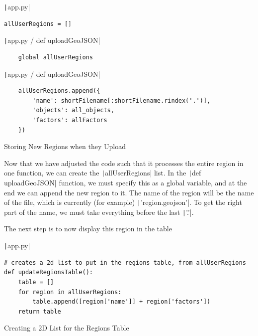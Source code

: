 \documentclass[12pt]{report}
\newcommand{\pil}[1]{\protect\texttt|#1|}
\begin{document}
\begin{center}
\end{center}

\begin{listing}[H]
\pil{app.py}
\begin{verbatim}
allUserRegions = []
\end{verbatim}
\pil{app.py / def uploadGeoJSON}
\begin{verbatim}
    global allUserRegions
\end{verbatim}
\pil{app.py / def uploadGeoJSON}
\begin{verbatim}
    allUserRegions.append({
        'name': shortFilename[:shortFilename.rindex('.')],
        'objects': all_objects,
        'factors': allFactors
    })
\end{verbatim}
\caption{Storing New Regions when they Upload}\label{cs:storeNewRegions}
\end{listing}

Now that we have adjusted the code such that it processes the entire region in one function, we can create the \pil{allUserRegions} list. In the \pil{def uploadGeoJSON} function, we must specify this as a global variable, and at the end we can append the new region to it. The name of the region will be the name of the file, which is currently (for example) \pil{'region.geojson'}. To get the right part of the name, we must take everything before the last \pil{'.'}.

The next step is to now display this region in the table

\begin{listing}[H]
\pil{app.py}
\begin{verbatim}
# creates a 2d list to put in the regions table, from allUserRegions 
def updateRegionsTable():
    table = []
    for region in allUserRegions:
        table.append([region['name']] + region['factors'])
    return table
\end{verbatim}
\caption{Creating a 2D List for the Regions Table}\label{cs:regionsTable2DList}
\end{listing}
\end{document}
